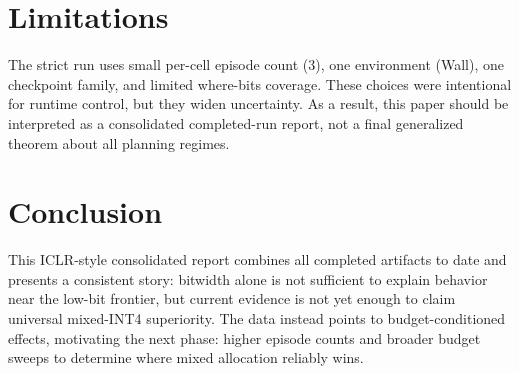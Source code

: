 \documentclass{article}
\begin{document}
\section{Limitations}
The strict run uses small per-cell episode count (3), one environment (Wall), one checkpoint family, and limited where-bits coverage.
These choices were intentional for runtime control, but they widen uncertainty.
As a result, this paper should be interpreted as a consolidated completed-run report, not a final generalized theorem about all planning regimes.

\section{Conclusion}
This ICLR-style consolidated report combines all completed artifacts to date and presents a consistent story:
bitwidth alone is not sufficient to explain behavior near the low-bit frontier, but current evidence is not yet enough to claim universal mixed-INT4 superiority.
The data instead points to budget-conditioned effects, motivating the next phase: higher episode counts and broader budget sweeps to determine where mixed allocation reliably wins.
\end{document}
